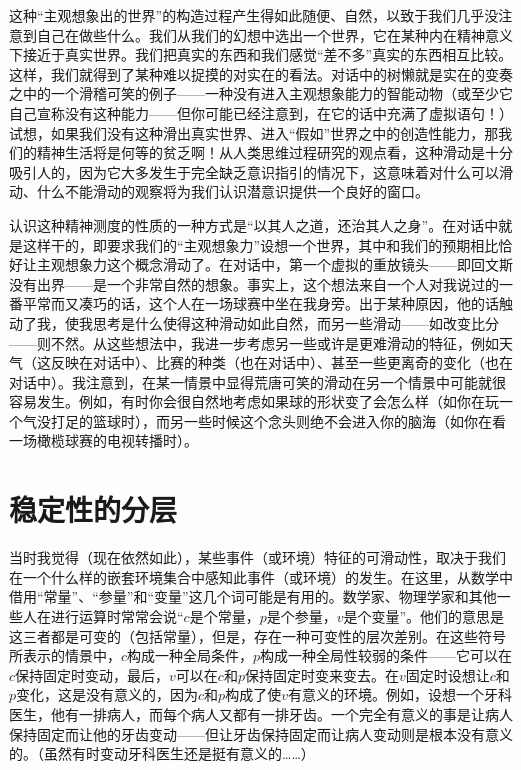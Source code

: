 这种“主观想象出的世界”的构造过程产生得如此随便、自然，以致于我们几乎没注意到自己在做些什么。我们从我们的幻想中选出一个世界，它在某种内在精神意义下接近于真实世界。我们把真实的东西和我们感觉“差不多”真实的东西相互比较。这样，我们就得到了某种难以捉摸的对实在的看法。对话中的树懒就是实在的变奏之中的一个滑稽可笑的例子——一种没有进入主观想象能力的智能动物（或至少它自己宣称没有这种能力——但你可能已经注意到，在它的话中充满了虚拟语句！）试想，如果我们没有这种滑出真实世界、进入“假如”世界之中的创造性能力，那我们的精神生活将是何等的贫乏啊！从人类思维过程研究的观点看，这种滑动是十分吸引人的，因为它大多发生于完全缺乏意识指引的情况下，这意味着对什么可以滑动、什么不能滑动的观察将为我们认识潜意识提供一个良好的窗口。

认识这种精神测度的性质的一种方式是“以其人之道，还治其人之身”。在对话中就是这样干的，即要求我们的“主观想象力”设想一个世界，其中和我们的预期相比恰好让主观想象力这个概念滑动了。在对话中，第一个虚拟的重放镜头——即回文斯没有出界——是一个非常自然的想象。事实上，这个想法来自一个人对我说过的一番平常而又凑巧的话，这个人在一场球赛中坐在我身旁。出于某种原因，他的话触动了我，使我思考是什么使得这种滑动如此自然，而另一些滑动——如改变比分——则不然。从这些想法中，我进一步考虑另一些或许是更难滑动的特征，例如天气（这反映在对话中）、比赛的种类（也在对话中）、甚至一些更离奇的变化（也在对话中）。我注意到，在某一情景中显得荒唐可笑的滑动在另一个情景中可能就很容易发生。例如，有时你会很自然地考虑如果球的形状变了会怎么样（如你在玩一个气没打足的篮球时），而另一些时候这个念头则绝不会进入你的脑海（如你在看一场橄榄球赛的电视转播时）。

\section{稳定性的分层}

当时我觉得（现在依然如此），某些事件（或环境）特征的可滑动性，取决于我们在一个什么样的嵌套环境集合中感知此事件（或环境）的发生。在这里，从数学中借用“常量”、“参量”和“变量”这几个词可能是有用的。数学家、物理学家和其他一些人在进行运算时常常会说“$c$是个常量，$p$是个参量，$v$是个变量”。他们的意思是这三者都是可变的（包括常量），但是，存在一种可变性的层次差别。在这些符号所表示的情景中，$c$构成一种全局条件，$p$构成一种全局性较弱的条件——它可以在$c$保持固定时变动，最后，$v$可以在$c$和$p$保持固定时变来变去。在$v$固定时设想让$c$和$p$变化，这是没有意义的，因为$c$和$p$构成了使$v$有意义的环境。例如，设想一个牙科医生，他有一排病人，而每个病人又都有一排牙齿。一个完全有意义的事是让病人保持固定而让他的牙齿变动——但让牙齿保持固定而让病人变动则是根本没有意义的。（虽然有时变动牙科医生还是挺有意义的……）

